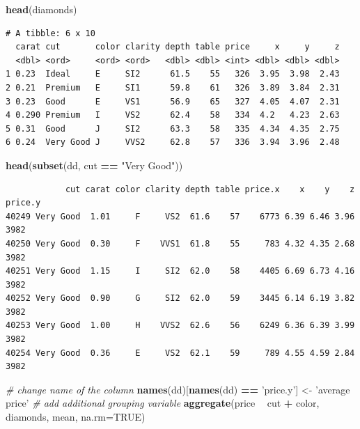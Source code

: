 \documentclass[
]{book}
\newenvironment{Shaded}{\begin{snugshade}}{\end{snugshade}}
\newcommand{\CommentTok}[1]{\textcolor[rgb]{0.56,0.35,0.01}{\textit{#1}}}
\newcommand{\DataTypeTok}[1]{\textcolor[rgb]{0.13,0.29,0.53}{#1}}
\newcommand{\KeywordTok}[1]{\textcolor[rgb]{0.13,0.29,0.53}{\textbf{#1}}}
\newcommand{\NormalTok}[1]{#1}
\newcommand{\OperatorTok}[1]{\textcolor[rgb]{0.81,0.36,0.00}{\textbf{#1}}}
\newcommand{\OtherTok}[1]{\textcolor[rgb]{0.56,0.35,0.01}{#1}}
\newcommand{\StringTok}[1]{\textcolor[rgb]{0.31,0.60,0.02}{#1}}
\begin{document}
\begin{Shaded}
\begin{Highlighting}[]
\KeywordTok{head}\NormalTok{(diamonds)}
\end{Highlighting}
\end{Shaded}

\begin{verbatim}
# A tibble: 6 x 10
  carat cut       color clarity depth table price     x     y     z
  <dbl> <ord>     <ord> <ord>   <dbl> <dbl> <int> <dbl> <dbl> <dbl>
1 0.23  Ideal     E     SI2      61.5    55   326  3.95  3.98  2.43
2 0.21  Premium   E     SI1      59.8    61   326  3.89  3.84  2.31
3 0.23  Good      E     VS1      56.9    65   327  4.05  4.07  2.31
4 0.290 Premium   I     VS2      62.4    58   334  4.2   4.23  2.63
5 0.31  Good      J     SI2      63.3    58   335  4.34  4.35  2.75
6 0.24  Very Good J     VVS2     62.8    57   336  3.94  3.96  2.48
\end{verbatim}

\begin{Shaded}
\begin{Highlighting}[]
\KeywordTok{head}\NormalTok{(}\KeywordTok{subset}\NormalTok{(dd, cut }\OperatorTok{==}\StringTok{ "Very Good"}\NormalTok{))}
\end{Highlighting}
\end{Shaded}

\begin{verbatim}
            cut carat color clarity depth table price.x    x    y    z price.y
40249 Very Good  1.01     F     VS2  61.6    57    6773 6.39 6.46 3.96    3982
40250 Very Good  0.30     F    VVS1  61.8    55     783 4.32 4.35 2.68    3982
40251 Very Good  1.15     I     SI2  62.0    58    4405 6.69 6.73 4.16    3982
40252 Very Good  0.90     G     SI2  62.0    59    3445 6.14 6.19 3.82    3982
40253 Very Good  1.00     H    VVS2  62.6    56    6249 6.36 6.39 3.99    3982
40254 Very Good  0.36     E     VS2  62.1    59     789 4.55 4.59 2.84    3982
\end{verbatim}

\begin{Shaded}
\begin{Highlighting}[]
\CommentTok{# change name of the column}
\KeywordTok{names}\NormalTok{(dd)[}\KeywordTok{names}\NormalTok{(dd) }\OperatorTok{==}\StringTok{ 'price.y'}\NormalTok{] <-}\StringTok{ 'average price'}
\CommentTok{# add additional grouping variable}
\KeywordTok{aggregate}\NormalTok{(price }\OperatorTok{~}\StringTok{ }\NormalTok{cut }\OperatorTok{+}\StringTok{ }\NormalTok{color, diamonds, mean, }\DataTypeTok{na.rm=}\OtherTok{TRUE}\NormalTok{)}
\end{Highlighting}
\end{Shaded}
\end{document}
